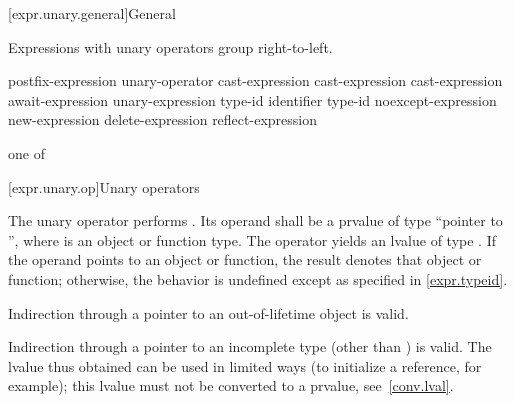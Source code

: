 [expr.unary.general]{General}

\pnum
{}%
Expressions with unary operators group right-to-left.

%
%
%
%
%
\begin{bnf}
\br
    postfix-expression\br
    unary-operator cast-expression\br
    \terminal{++} cast-expression\br
    \terminal{--} cast-expression\br
    await-expression\br
     unary-expression\br
     \terminal{(} type-id \terminal{)}\br
      \terminal{(} identifier \terminal{)}\br
     \terminal{(} type-id \terminal{)}\br
    noexcept-expression\br
    new-expression\br
    delete-expression\br
    reflect-expression
\end{bnf}

%
%
%
%
%
%
%
%
%
%
%
%
%
%
%
\begin{bnf}
 \textnormal{one of}\br
    \terminal{*  \&  +  -  !  \~}
\end{bnf}

[expr.unary.op]{Unary operators}

\pnum
{}%
%
The unary \tcode{*} operator performs .
%
Its operand shall be a prvalue of type ``pointer to '',
where  is an object or function type.
The operator yields an lvalue of type .
If the operand points to an object or function,
the result denotes that object or function;
otherwise, the behavior is undefined except as specified in \ref{expr.typeid}.
\begin{note}
Indirection through a pointer to an out-of-lifetime object is valid.
\end{note}
\begin{note}
%
Indirection through a pointer to an incomplete type (other than
\cv{} ) is valid. The lvalue thus obtained can be
used in limited ways (to initialize a reference, for example); this
lvalue must not be converted to a prvalue, see~\ref{conv.lval}.
\end{note}

